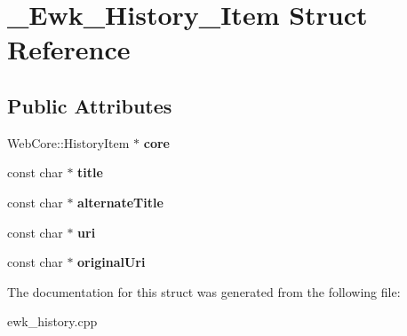 \hypertarget{struct__Ewk__History__Item}{\section{\+\_\+\+Ewk\+\_\+\+History\+\_\+\+Item Struct Reference}
\label{struct__Ewk__History__Item}
}
\subsection*{Public Attributes}
\begin{DoxyCompactItemize}
\item 
\hypertarget{struct__Ewk__History__Item_a7766803cad25a521acdbbebe633a2a21}{Web\+Core\+::\+History\+Item $\ast$ {\bfseries core}}\label{struct__Ewk__History__Item_a7766803cad25a521acdbbebe633a2a21}

\item 
\hypertarget{struct__Ewk__History__Item_a4df69dbf37aced5e3efc963f2a93753a}{const char $\ast$ {\bfseries title}}\label{struct__Ewk__History__Item_a4df69dbf37aced5e3efc963f2a93753a}

\item 
\hypertarget{struct__Ewk__History__Item_a19dd72670c9f04792b0a0ddcf3bfae9b}{const char $\ast$ {\bfseries alternate\+Title}}\label{struct__Ewk__History__Item_a19dd72670c9f04792b0a0ddcf3bfae9b}

\item 
\hypertarget{struct__Ewk__History__Item_ab4e8de93a1477547cea478b87ea0efdb}{const char $\ast$ {\bfseries uri}}\label{struct__Ewk__History__Item_ab4e8de93a1477547cea478b87ea0efdb}

\item 
\hypertarget{struct__Ewk__History__Item_aeddc9404d09971e0a996f903bafde695}{const char $\ast$ {\bfseries original\+Uri}}\label{struct__Ewk__History__Item_aeddc9404d09971e0a996f903bafde695}

\end{DoxyCompactItemize}


The documentation for this struct was generated from the following file\+:\begin{DoxyCompactItemize}
\item 
ewk\+\_\+history.\+cpp\end{DoxyCompactItemize}
